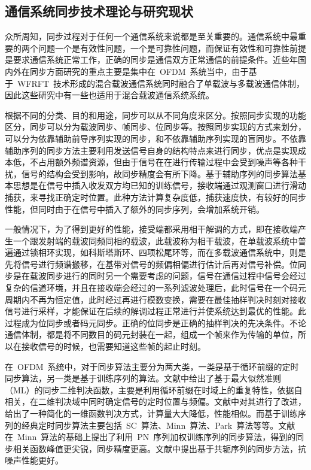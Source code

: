 \subsection{通信系统同步技术理论与研究现状}
众所周知，同步过程对于任何一个通信系统来说都是至关重要的。通信系统中最重要的两个问题一个是有效性问题，一个是可靠性问题，而保证有效性和可靠性前提是要求通信系统正常工作，正确的同步是通信双方正常通信的前提条件。近些年国内外在同步方面研究的重点主要是集中在~OFDM~系统当中，由于基于~WFRFT~技术形成的混合载波通信系统同时融合了单载波与多载波通信体制，因此这些研究中有一些也适用于混合载波通信系统系统。

根据不同的分类、目的和用途，同步可以从不同角度来区分。按照同步实现的功能区分，同步可以分为载波同步、帧同步、位同步等。按照同步实现的方式来划分，可以分为依靠辅助前导序列实现的同步，和不依靠辅助序列实现的盲同步。不依靠辅助序列的同步方法主要利用发送信号自身的结构特点来进行同步，优点是实现成本低，不占用额外频谱资源，但由于信号在在进行传输过程中会受到噪声等各种干扰，信号的结构会受到影响，故同步精度会有所下降。基于辅助序列的同步算法基本思想是在信号中插入收发双方均已知的训练信号，接收端通过观测窗口进行滑动捕获，来寻找正确定时位置。此种方法计算复杂度低，捕获速度快，有较好的同步性能，但同时由于在信号中插入了额外的同步序列，会增加系统开销。

一般情况下，为了得到更好的性能，接受端都采用相干解调的方式，即在接收端产生一个跟发射端的载波同频同相的载波，此载波称为相干载波，在单载波系统中普遍通过锁相环实现，如科斯塔斯环、四项松尾环等，而在多载波通信系统中，则是先将信号进行频谱搬移，在基带对信号的频偏相偏进行估计后再对信号补偿。位同步是在载波同步进行的同时另一个需要考虑的问题，信号在通信过程中信号会经过复杂的信道环境，并且在接收端会经过的一系列滤波处理后，此时信号在一个码元周期内不再为恒定值，此时经过再进行模数变换，需要在最佳抽样判决时刻对接收信号进行采样，才能保证在后续的解调过程正常进行并使系统达到最优的性能。此过程成为位同步或者码元同步。正确的位同步是正确的抽样判决的先决条件。不论通信体制，都是将不同数目的码元封装在一起，组成一个帧来作为传输的单位，所以在接收信号的时候，也需要知道这些帧的起止时刻。

在~OFDM~系统中，对于同步算法主要分为两大类，一类是基于循环前缀的定时同步算法，另一类是基于训练序列的算法。文献中给出了基于最大似然准则（ML）的同步二维判决函数，主要是利用循环前缀在时域上的重复特性，依据自相关，在二维判决域中同时确定信号的定时位置与频偏。文献中对其进行了改进，给出了一种简化的一维函数判决方式，计算量大大降低，性能相似。而基于训练序列的经典定时同步算法主要包括~SC~算法、Minn~算法、Park~算法等等。文献在~Minn~算法的基础上提出了利用~PN~序列加权训练序列的同步算法，得到的同步相关函数峰值更尖锐，同步精度更高。文献中提出基于共轭序列的同步方法，抗噪声性能更好。

